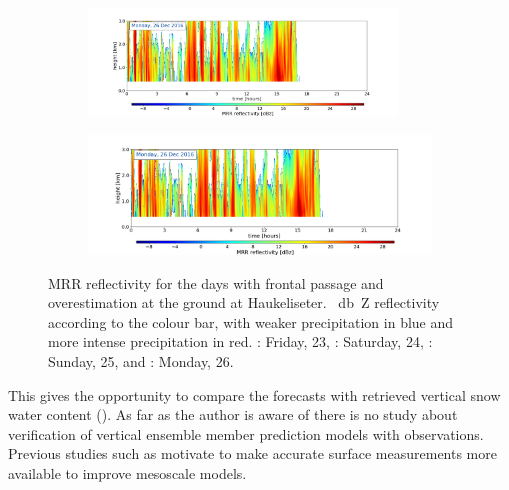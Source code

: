 \begin{figure}[H]
\begin{subfigure}[t]{\textwidth}
		\caption{}\label{fig:ret:refl25}
	\end{subfigure}
	\begin{subfigure}[t]{\textwidth}
		\centering
		\includegraphics[trim={4.cm 2.5cm 4.5cm 1.5cm},clip,width=0.9\textwidth]{./fig_MRR_refl/MRR_20161226}
		\caption{}\label{fig:ret:refl26}
	\end{subfigure}
	\begin{subfigure}[t]{\textwidth}
		\includegraphics[trim={6.5cm 0cm 5.3cm 15.5cm},clip,width=\textwidth]{./fig_MRR_refl/MRR_20161226}
	\end{subfigure}
	\caption{MRR reflectivity for the days with frontal passage and overestimation at the ground at Haukeliseter. \SI{}{\decibel Z} reflectivity according to the colour bar, with weaker precipitation in blue and more intense precipitation in red. \protect{}: Friday, \SI{23}{\dec}, 
		\protect{}: Saturday, \SI{24}{\dec}, 
		\protect{}: Sunday, \SI{25}{\dec}, and \protect{}: Monday, \SI{26}{\dec}.}\label{fig:ret:refl}
\end{figure}
\noindent
This %
gives the opportunity to compare the forecasts %
with retrieved vertical snow water content ().
As far as the author is aware of there is no study about verification of vertical ensemble member prediction models with observations.
\\
Previous studies such as \citet{joos_influence_2012} motivate to make accurate surface measurements more available to improve mesoscale models.
